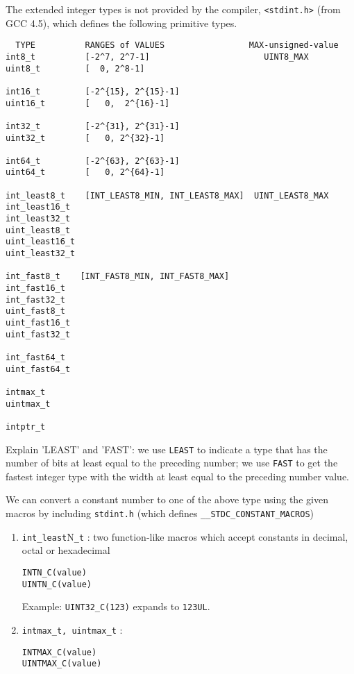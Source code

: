 The extended integer types is not provided by the compiler, 
\verb!<stdint.h>! (from GCC 4.5), which defines the following primitive types.

\begin{verbatim}
  TYPE          RANGES of VALUES                 MAX-unsigned-value
int8_t          [-2^7, 2^7-1]                       UINT8_MAX
uint8_t         [  0, 2^8-1]

int16_t         [-2^{15}, 2^{15}-1]
uint16_t        [   0,  2^{16}-1]

int32_t         [-2^{31}, 2^{31}-1]
uint32_t        [   0, 2^{32}-1]

int64_t         [-2^{63}, 2^{63}-1]
uint64_t        [   0, 2^{64}-1]

int_least8_t    [INT_LEAST8_MIN, INT_LEAST8_MAX]  UINT_LEAST8_MAX
int_least16_t
int_least32_t
uint_least8_t
uint_least16_t
uint_least32_t

int_fast8_t    [INT_FAST8_MIN, INT_FAST8_MAX]
int_fast16_t
int_fast32_t
uint_fast8_t
uint_fast16_t
uint_fast32_t

int_fast64_t
uint_fast64_t

intmax_t
uintmax_t

intptr_t
\end{verbatim}
Explain 'LEAST' and 'FAST': we use \verb!LEAST! to indicate a type that has the
number of bits at least equal to the preceding number; we use \verb!FAST! to get
the fastest integer type with the width at least equal to the preceding number
value.

We can convert a constant number to one of the above type using the given macros
by including \verb!stdint.h! (which defines \verb!__STDC_CONSTANT_MACROS!)
\begin{enumerate}
  \item \verb!int_least!N\verb!_t! : two function-like macros which accept
  constants in decimal, octal or hexadecimal
\begin{verbatim}
INTN_C(value)
UINTN_C(value)
\end{verbatim}
Example: \verb!UINT32_C(123)! expands to \verb!123UL!.

   \item \verb!intmax_t, uintmax_t! :
\begin{verbatim}
INTMAX_C(value)
UINTMAX_C(value)
\end{verbatim} 
\end{enumerate}


